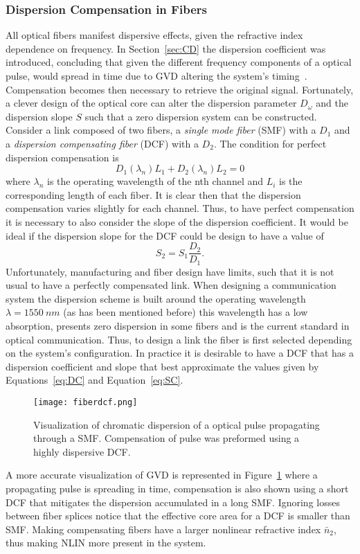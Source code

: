 \subsubsection{Dispersion Compensation in Fibers}\label{sec:DisCom}
 All optical fibers manifest dispersive effects, given the  refractive index dependence on frequency. In Section~\ref{sec:CD} the dispersion coefficient was introduced, concluding that given the different frequency components of a optical pulse, would spread in time due to GVD altering the system's timing~\cite{goldfarb2007chromatic}. Compensation becomes then necessary to retrieve the original signal. Fortunately, a clever design of the optical core can alter the dispersion parameter $D_\omega$ and the dispersion slope $S$ such that a zero dispersion system can be constructed. Consider a link composed of two fibers, a \textit{single mode fiber }(SMF) with a $D_{1}$ and a \textit{dispersion compensating fiber} (DCF) with a $D_{2}$. The condition for perfect dispersion compensation is 
\begin{equation}
D_{1}(\lambda_{n})L_{1}+D_{2}(\lambda_{n})L_{2}=0\label{eq:DC}
\end{equation}
where $\lambda_{n}$ is the operating wavelength of the nth channel and $L_{i}$ is the corresponding length of each fiber. It is clear then that the dispersion compensation varies slightly for each channel. Thus, to have  perfect compensation it is necessary to also consider the slope of the dispersion coefficient. It would be ideal if the dispersion slope for the DCF could be design to have a value of
\begin{equation}
S_{2}=S_{1}\frac{D_{2}}{D_{1}}.\label{eq:SC}
\end{equation}
\indent Unfortunately, manufacturing and fiber design have limits, such that it is not usual to have a perfectly compensated link. When designing a communication system the dispersion scheme is built around the operating wavelength $\lambda=1550~nm$ (as has been mentioned before) this wavelength has a low absorption, presents zero dispersion in some fibers and is the current standard in optical communication. Thus, to design a link the fiber is first selected depending on the system's configuration. In practice it is desirable to have a DCF that has a dispersion coefficient and slope that best approximate the values given by Equations~\ref{eq:DC} and Equation~\ref{eq:SC}. 
\begin{figure}[h]
\center
\texttt{[image: fiberdcf.png]}
\caption{Visualization of chromatic dispersion of a optical pulse propagating through a SMF. Compensation of pulse was preformed using a highly dispersive DCF.  }
\label{fig:GVD}
\end{figure} 
A more accurate visualization of GVD is represented in Figure~\ref{fig:GVD} where a propagating pulse is spreading in time, compensation is also shown using a short DCF that mitigates the dispersion accumulated in a long SMF. Ignoring losses between fiber splices notice that the effective core area for a DCF is smaller than SMF. Making compensating fibers have a larger nonlinear refractive index $\bar{n}_{2}$, thus making NLIN more present in the system. 




